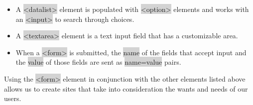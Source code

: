 \documentclass[11pt]{article}
\begin{document}
\begin{itemize}[leftmargin = *]
\item A \colorbox{lightgray}{<datalist>} element is populated with \colorbox{lightgray}{<option>} elements and works with an \colorbox{lightgray}{<input>} to search through choices.
\item A \colorbox{lightgray}{<textarea>} element is a text input field that has a customizable area.
\item When a \colorbox{lightgray}{<form>} is submitted, the \colorbox{lightgray}{name} of the fields that accept input and the \colorbox{lightgray}{value} of those fields are sent as \colorbox{lightgray}{name=value} pairs.
\end{itemize}
Using the \colorbox{lightgray}{<form>} element in conjunction with the other elements listed above allows us to create sites that take into consideration the wants and needs of our users.
\end{document}
